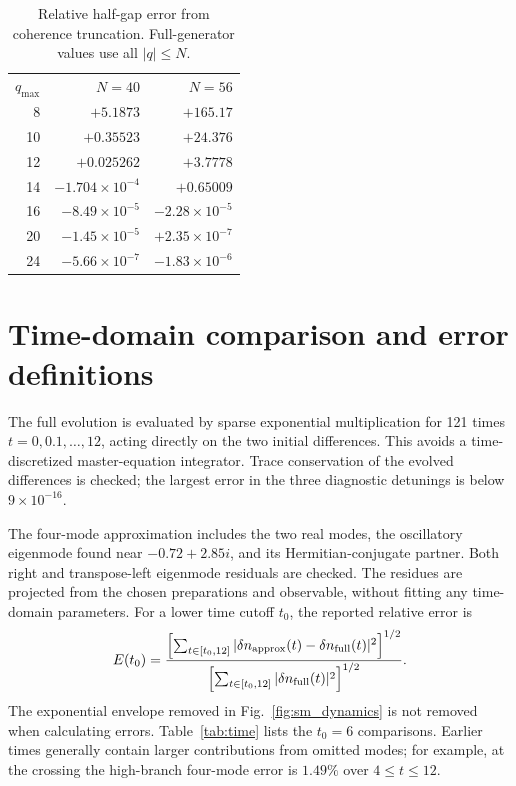 \documentclass[aps,pra,10pt,onecolumn,superscriptaddress,amsmath,amssymb]{revtex4-2}
\begin{document}
\begin{table}[h]
\caption{Relative half-gap error from coherence truncation. Full-generator values use all $|q|\le N$.}
\label{tab:cutoff}
\begin{ruledtabular}
\begin{tabular}{rrr}
$q_{\max}$&$N=40$&$N=56$\\
8&$+5.1873$&$+165.17$\\
10&$+0.35523$&$+24.376$\\
12&$+0.025262$&$+3.7778$\\
14&$-1.704\times10^{-4}$&$+0.65009$\\
16&$-8.49\times10^{-5}$&$-2.28\times10^{-5}$\\
20&$-1.45\times10^{-5}$&$+2.35\times10^{-7}$\\
24&$-5.66\times10^{-7}$&$-1.83\times10^{-6}$
\end{tabular}
\end{ruledtabular}
\end{table}

\section{Time-domain comparison and error definitions}
The full evolution is evaluated by sparse exponential multiplication for 121 times $t=0,0.1,\ldots,12$, acting directly on the two initial differences. This avoids a time-discretized master-equation integrator. Trace conservation of the evolved differences is checked; the largest error in the three diagnostic detunings is below $9\times10^{-16}$.

The four-mode approximation includes the two real modes, the oscillatory eigenmode found near $-0.72+2.85i$, and its Hermitian-conjugate partner. Both right and transpose-left eigenmode residuals are checked. The residues are projected from the chosen preparations and observable, without fitting any time-domain parameters. For a lower time cutoff $t_0$, the reported relative error is
\begin{equation}
 E(t_0)=\frac{\left[\sum_{t\in[t_0,12]}|\delta n_{\rm approx}(t)-\delta n_{\rm full}(t)|^2\right]^{1/2}}
 {\left[\sum_{t\in[t_0,12]}|\delta n_{\rm full}(t)|^2\right]^{1/2}}.
\end{equation}
The exponential envelope removed in Fig.~\ref{fig:sm_dynamics} is not removed when calculating errors. Table~\ref{tab:time} lists the $t_0=6$ comparisons. Earlier times generally contain larger contributions from omitted modes; for example, at the crossing the high-branch four-mode error is $1.49\%$ over $4\le t\le12$.
\end{document}
